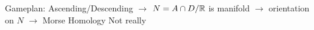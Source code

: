 \documentclass[a4paper,11pt,draft]{article}
\begin{document}
Gameplan: Ascending/Descending $\to$ $N = A \cap D / { \mathbb R }$ is manifold 
$\to$ orientation on $N$ $\to$ Morse Homology Not really








\end{document}
